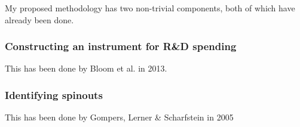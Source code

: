 \documentclass[12pt,english]{article}
\theoremstyle{remark}
\begin{document}
My proposed methodology has two non-trivial components, both of which have already been done.

\subsubsection{Constructing an instrument for R\&D spending}

This has been done by Bloom et al. in 2013. 

\subsubsection{Identifying spinouts}

This has been done by Gompers, Lerner \& Scharfstein in 2005
\end{document}
